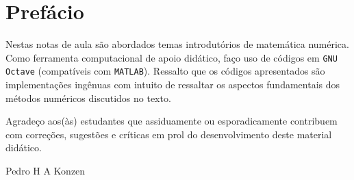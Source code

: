 
\chapter*{Prefácio}\label{prefacio}

Nestas notas de aula são abordados temas introdutórios de matemática numérica. Como ferramenta computacional de apoio didático, faço uso de códigos em \verb+GNU Octave+ (compatíveis com \verb+MATLAB+). Ressalto que os códigos apresentados são implementações ingênuas com intuito de ressaltar os aspectos fundamentais dos métodos numéricos discutidos no texto.

Agradeço aos(às) estudantes que assiduamente ou esporadicamente contribuem com correções, sugestões e críticas em prol do desenvolvimento deste material didático.

\begin{flushright}
  Pedro H A Konzen
\end{flushright}

